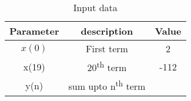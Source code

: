 \begin{table}[h]
\renewcommand\thetable{1}
    \centering
    \begin{tabular}{|c|c|c|}
        \hline
        \textbf{Parameter} & \textbf{description} & \textbf{Value}\\
        \hline
        \(x(0)\) & First term & 2\\
        \hline
        x(19) & 20\textsuperscript{th} term & -112\\
        \hline
        y(n) & sum upto n\textsuperscript{th} term & \\
        \hline
    \end{tabular}
    \caption{Input data}
  \label{input data}
\end{table}
